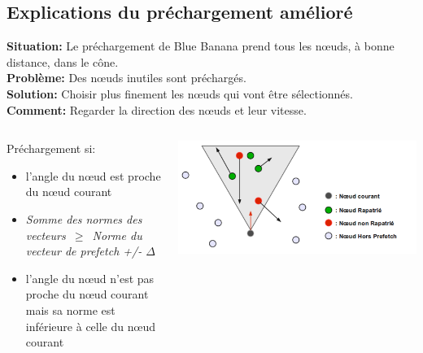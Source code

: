 \documentclass{beamer}
\begin{document}
  \subsection{Explications du préchargement amélioré}
  \begin{frame}
	\textbf{Situation:} Le préchargement de Blue Banana prend tous les nœuds, à bonne distance, dans le cône.\\
	\vspace{5mm}
	\textbf{Problème:} Des nœuds inutiles sont préchargés.\\
	\vspace{5mm}
	\textbf{Solution:} Choisir plus finement les nœuds qui vont être sélectionnés.\\
	\vspace{5mm}
	\textbf{Comment:} Regarder la direction des nœuds et leur vitesse.\\
  \end{frame}

  \begin{frame}
	\begin{columns}
         \begin{column}{5cm}
	 Préchargement si:
          \begin{itemize}
		\item l'angle du nœud est proche du nœud courant
		\item \textit{Somme des normes des vecteurs~$\ge$~Norme du vecteur de prefetch +/- $\Delta$}
		\item l'angle du nœud n'est pas proche du nœud courant mais sa norme est inférieure à celle du nœud courant
	  \end{itemize}
	 \end{column}
         \begin{column}{6cm}
          \includegraphics[scale=0.11]{./Ressources/Images/prefetchaV1.png}\\
         \end{column}
        \end{columns}

  \end{frame}
	
\end{document}
